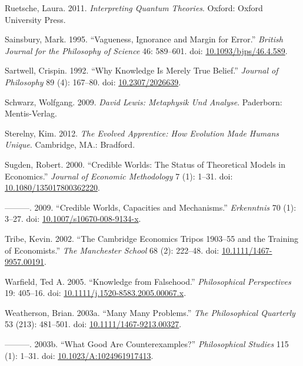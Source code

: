 \documentclass[
  11pt,
  letterpaper,
  DIV=11,
  numbers=noendperiod,
  twoside]{scrartcl}
\newlength{\cslhangindent}
\newenvironment{CSLReferences}[2] %
 {\begin{list}{}{%
  \setlength{\itemindent}{0pt}
  \setlength{\leftmargin}{0pt}
  \setlength{\parsep}{0pt}
  \ifodd #1
   \setlength{\leftmargin}{\cslhangindent}
   \setlength{\itemindent}{-1\cslhangindent}
  \fi
  \setlength{\itemsep}{#2\baselineskip}}}
 {\end{list}}
\begin{document}
\begin{CSLReferences}{1}{0}
Ruetsche, Laura. 2011. \emph{Interpreting Quantum Theories}. Oxford:
Oxford University Press.

Sainsbury, Mark. 1995. {``Vagueness, Ignorance and Margin for Error.''}
\emph{British Journal for the Philosophy of Science} 46: 589--601. doi:
\href{https://doi.org/10.1093/bjps/46.4.589}{10.1093/bjps/46.4.589}.

Sartwell, Crispin. 1992. {``Why Knowledge Is Merely True Belief.''}
\emph{Journal of Philosophy} 89 (4): 167--80. doi:
\href{https://doi.org/10.2307/2026639}{10.2307/2026639}.

Schwarz, Wolfgang. 2009. \emph{David Lewis: Metaphysik Und Analyse}.
Paderborn: Mentis-Verlag.

Sterelny, Kim. 2012. \emph{The Evolved Apprentice: How Evolution Made
Humans Unique}. Cambridge, MA.: Bradford.

Sugden, Robert. 2000. {``Credible Worlds: The Status of Theoretical
Models in Economics.''} \emph{Journal of Economic Methodology} 7 (1):
1--31. doi:
\href{https://doi.org/10.1080/135017800362220}{10.1080/135017800362220}.

---------. 2009. {``Credible Worlds, Capacities and Mechanisms.''}
\emph{Erkenntnis} 70 (1): 3--27. doi:
\href{https://doi.org/10.1007/s10670-008-9134-x}{10.1007/s10670-008-9134-x}.

Tribe, Kevin. 2002. {``The Cambridge Economics Tripos 1903--55 and the
Training of Economists.''} \emph{The Manchester School} 68 (2): 222--48.
doi:
\href{https://doi.org/10.1111/1467-9957.00191}{10.1111/1467-9957.00191}.

Warfield, Ted A. 2005. {``Knowledge from Falsehood.''}
\emph{Philosophical Perspectives} 19: 405--16. doi:
\href{https://doi.org/10.1111/j.1520-8583.2005.00067.x}{10.1111/j.1520-8583.2005.00067.x}.

Weatherson, Brian. 2003a. {``{Many Many Problems}.''} \emph{The
Philosophical Quarterly} 53 (213): 481--501. doi:
\href{https://doi.org/10.1111/1467-9213.00327}{10.1111/1467-9213.00327}.

---------. 2003b. {``{What Good Are Counterexamples?}''}
\emph{Philosophical Studies} 115 (1): 1--31. doi:
\href{https://doi.org/10.1023/A:1024961917413}{10.1023/A:1024961917413}.


\end{CSLReferences}
\end{document}

